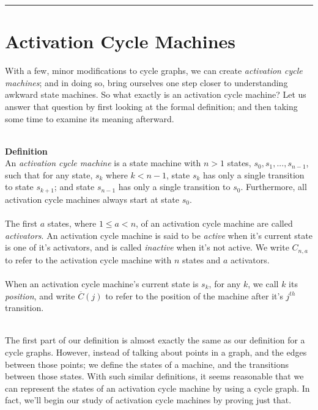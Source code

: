 \documentclass[a4paper,12pt]{article}
\begin{document}
\begin{center}
\noindent\rule{8cm}{0.4pt}
\end{center}

\section{Activation Cycle Machines}
With a few, minor modifications to cycle graphs, we can create \textit{activation cycle machines}; and in doing so, bring ourselves one step closer to understanding awkward state machines. So what exactly is an activation cycle machine? Let us answer that question by first looking at the formal definition; and then taking some time to examine its meaning afterward.\\
\\
\begin{tcolorbox}
\textbf{Definition}\\
An \textit{activation cycle machine} is a state machine with $n > 1$ states, $s_0, s_1, ..., s_{n-1}$, such that for any state, $s_k$ where $k < n - 1$, state $s_k$ has only a single transition to state $s_{k+1}$; and state $s_{n-1}$ has only a single transition to $s_0$. Furthermore, all activation cycle machines always start at state $s_0$.\\
\\
The first $a$ states, where $1 \leq a < n$, of an activation cycle machine are called \textit{activators}. An activation cycle machine is said to be \textit{active} when it's current state is one of it's activators, and is called \textit{inactive} when it's not active. We write $C_{n,a}$ to refer to the activation cycle machine with $n$ states and $a$ activators.\\
\\
When an activation cycle machine's current state is $s_k$, for any $k$, we call $k$ its \textit{position}, and write $\overline{C}(j)$ to refer to the position of the machine after it's $j^{th}$ transition. 
\end{tcolorbox}
\noindent
\\
The first part of our definition is almost exactly the same as our definition for a cycle graphs. However, instead of talking about points in a graph, and the edges between those points; we define the states of a machine, and the transitions between those states. With such similar definitions, it seems reasonable that we can represent the states of an activation cycle machine by using a cycle graph. In fact, we'll begin our study of activation cycle machines by proving just that.\\
\end{document}
